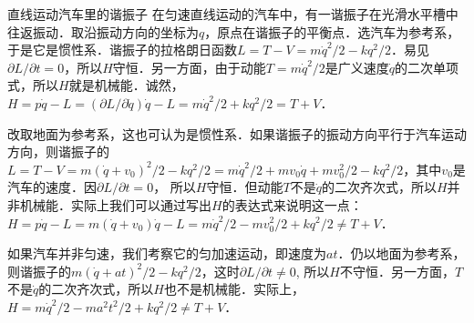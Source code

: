 \begin{example}{直线运动汽车里的谐振子}
在匀速直线运动的汽车中，有一谐振子在光滑水平槽中往返振动．取沿振动方向的坐标为$q$，原点在谐振子的平衡点．选汽车为参考系，于是它是惯性系．谐振子的拉格朗日函数$L=T-V=m \dot{q}^{2} / 2-k q^{2} / 2$．易见$\partial L / \partial t=0$，所以$H $守恒．另一方面，由于动能$T=m \dot{q}^{2} / 2$是广义速度$\dot q $的二次单项式，所以$H $就是机械能．诚然，$ H=p\dot q-L=(\partial L / \partial \dot{q}) \dot{q}-L=m \dot{q}^{2} / 2+k q^{2} / 2=T+V$．

改取地面为参考系，这也可认为是惯性系．如果谐振子的振动方向平行于汽车运动方向，则谐振子的$L=T-V=m\left(\dot{q}+v_{0}\right)^{2} / 2-k q^{2} / 2=m \dot{q}^{2} / 2+m v_{0} \dot{q}+m v_{0}^{2} / 2-k q^{2} / 2$，其中$v_0$是汽车的速度．因$\partial L / \partial t=0$， 所以$H $守恒．但动能$T$不是$\dot q $的二次齐次式，所以$H $并非机械能．实际上我们可以通过写出$H$的表达式来说明这一点：$H=p \dot{q}-L=m\left(\dot{q}+v_{0}\right) \dot{q}-L=m \dot{q}^{2} / 2-m v_{0}^{2} / 2+k q^{2} / 2 \neq T+V$．

如果汽车并非匀速，我们考察它的匀加速运动，即速度为$at $．仍以地面为参考系，则谐振子的$m(\dot{q}+a t)^{2} / 2-k q^{2} / 2$，这时$\partial L / \partial t \neq 0$, 所以$H $不守恒．另一方面，$T$不是$\dot q $的二次齐次式，所以$H$也不是机械能．实际上，$H=m \dot{q}^{2} / 2-m a^{2} t^{2} / 2+k q^{2} / 2 \neq T+V$．
\end{example}
